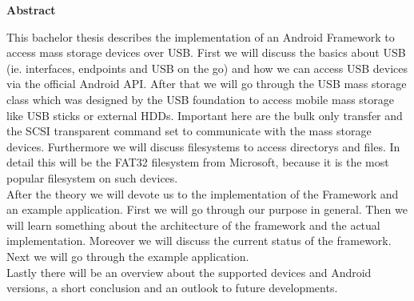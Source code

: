 

\clearemptydoublepage
{}
{}	





\vspace*{2cm}
\begin{center}
{\Large \bf Abstract}
\end{center}
\vspace{1cm}

This bachelor thesis describes the implementation of an Android Framework to access mass storage devices over USB. First we will discuss the basics about USB (ie. interfaces, endpoints and USB on the go) and how we can access USB devices via the official Android API. After that we will go through the USB mass storage class which was designed by the USB foundation to access mobile mass storage like USB sticks or external HDDs. Important here are the bulk only transfer and the SCSI transparent command set to communicate with the mass storage devices. Furthermore we will discuss filesystems to access directorys and files. In detail this will be the FAT32 filesystem from Microsoft, because it is the most popular filesystem on such devices.\\
After the theory we will devote us to the implementation of the Framework and an example application. First we will go through our purpose in general. Then we will learn something about the architecture of the framework and the actual implementation. Moreover we will discuss the current status of the framework. Next we will go through the example application.\\
Lastly there will be an overview about the supported devices and Android versions, a short conclusion and an outlook to future developments.